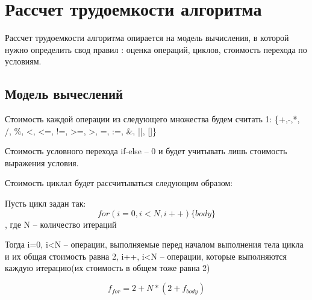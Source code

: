 \section{ Рассчет трудоемкости алгоритма}

Рассчет трудоемкости алгоритма опирается на модель вычисления, в которой нужно определить свод правил : оценка операций, циклов, стоимость перехода по условиям.

\subsection{Модель вычеслений}

Стоимость каждой операции из следующего множества будем считать 1:
\{+,-,*, /, \%, <, <=, !=, >=, >, =, :=, \&, ||, []\}

Стоимость условного перехода if-else -- 0 и будет учитывать лишь стоимость выражения условия.

Стоимость циклал будет рассчитываться следующим образом:

Пусть цикл задан так:
\begin{equation}
        for(i=0, i<N, i++) \{ body \}
\end{equation}
, где N -- количество итераций

Тогда
i=0, i<N -- операции, выполняемые перед началом выполнения тела цикла и их общая стоимость равна 2, 
i++, i<N -- операции, которые выполняются каждую итерацию(их стоимость в общем тоже равна 2)

\begin{equation}
    f_{for} = 2 + N*(2 + f_{body})
\end{equation}
